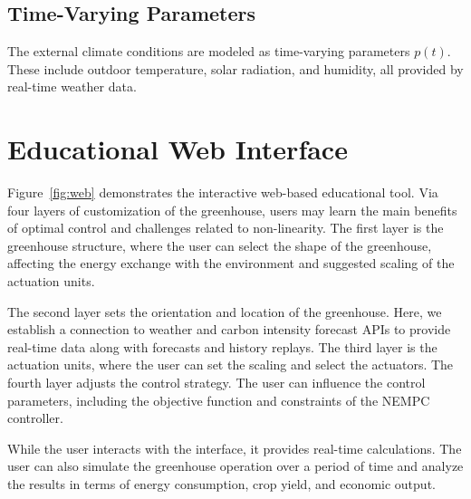 \documentclass[conference]{IEEEtran}
\begin{document}
\subsection{Time-Varying Parameters}

The external climate conditions are modeled as time-varying parameters \( p(t) \). These include outdoor temperature, solar radiation, and humidity, all provided by real-time weather data.

\section{Educational Web Interface}
Figure~\ref{fig:web} demonstrates the interactive web-based educational tool. Via four layers of customization of the greenhouse, users may learn the main benefits of optimal control and challenges related to non-linearity. The first layer is the greenhouse structure, where the user can select the shape of the greenhouse, affecting the energy exchange with the environment and suggested scaling of the actuation units.

The second layer sets the orientation and location of the greenhouse. Here, we establish a connection to weather and carbon intensity forecast APIs to provide real-time data along with forecasts and history replays.
The third layer is the actuation units, where the user can set the scaling and select the actuators. The fourth layer adjusts the control strategy. The user can influence the control parameters, including the objective function and constraints of the NEMPC controller.

While the user interacts with the interface, it provides real-time calculations. The user can also simulate the greenhouse operation over a period of time and analyze the results in terms of energy consumption, crop yield, and economic output.
\end{document}
